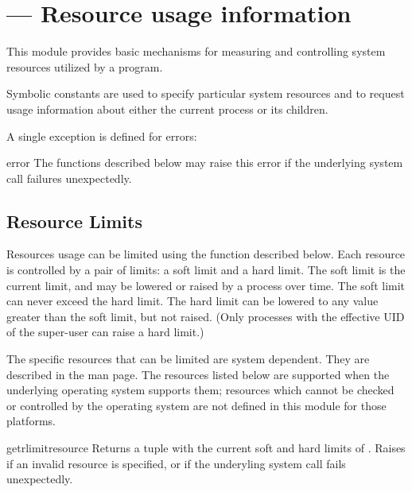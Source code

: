 \section{ ---
         Resource usage information}



This module provides basic mechanisms for measuring and controlling
system resources utilized by a program.

Symbolic constants are used to specify particular system resources and
to request usage information about either the current process or its
children.

A single exception is defined for errors:


\begin{excdesc}{error}
  The functions described below may raise this error if the underlying
  system call failures unexpectedly.
\end{excdesc}

\subsection{Resource Limits}

Resources usage can be limited using the  function
described below. Each resource is controlled by a pair of limits: a
soft limit and a hard limit. The soft limit is the current limit, and
may be lowered or raised by a process over time. The soft limit can
never exceed the hard limit. The hard limit can be lowered to any
value greater than the soft limit, but not raised. (Only processes with
the effective UID of the super-user can raise a hard limit.)

The specific resources that can be limited are system dependent. They
are described in the  man page.  The resources
listed below are supported when the underlying operating system
supports them; resources which cannot be checked or controlled by the
operating system are not defined in this module for those platforms.

\begin{funcdesc}{getrlimit}{resource}
  Returns a tuple  with the current
  soft and hard limits of . Raises  if
  an invalid resource is specified, or  if the
  underyling system call fails unexpectedly.
\end{funcdesc}

